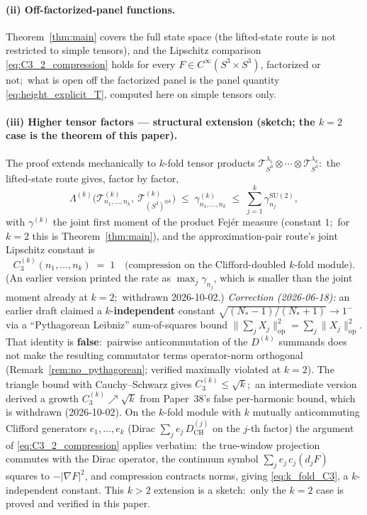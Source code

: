 \documentclass[11pt,a4paper]{article}
\theoremstyle{plain}
\theoremstyle{definition}
\newcommand{\sthree}{S^{3}}
\newcommand{\Tcal}{\mathcal{T}}
\newcommand{\opnorm}[1]{\lVert #1 \rVert_{\mathrm{op}}}
\newcommand{\SU}{\mathrm{SU}}
\newcommand{\DCH}{D_{\mathrm{CH}}}
\begin{document}
\paragraph{(ii) Off-factorized-panel functions.} Theorem~\ref{thm:main}
covers the full state space (the lifted-state route is not restricted to
simple tensors), and the Lipschitz comparison
\eqref{eq:C3_2_compression} holds for every
$F \in C^\infty(\sthree \times \sthree)$, factorized or not;\ what is open
off the factorized panel is the panel quantity \eqref{eq:height_explicit_T},
computed here on simple tensors only.

\paragraph{(iii) Higher tensor factors --- structural extension
(sketch; the $k=2$ case is the theorem of this paper).} The proof
extends mechanically to $k$-fold tensor products
$\Tcal_{\sthree}^{\lambda_1} \otimes \cdots \otimes
\Tcal_{\sthree}^{\lambda_k}$:\ the lifted-state route gives, factor by
factor,
\begin{equation}\label{eq:k_fold_main}
\Lambda^{(k)}\bigl(\Tcal^{(k)}_{n_{1}, \ldots, n_{k}},\
\Tcal^{(k)}_{(\sthree)^{\otimes k}}\bigr)
\;\le\; \gamma^{(k)}_{n_{1}, \ldots, n_{k}}
\;\le\; \sum_{j=1}^{k} \gamma^{\SU(2)}_{n_{j}},
\end{equation}
with $\gamma^{(k)}$ the joint first moment of the product Fej\'er measure
(constant $1$;\ for $k=2$ this is Theorem~\ref{thm:main}), and the
approximation-pair route's joint Lipschitz constant is
\begin{equation}\label{eq:k_fold_C3}
C_{3}^{(k)}(n_{1}, \ldots, n_{k}) \;=\; 1
\quad\text{(compression on the Clifford-doubled $k$-fold module)}.
\end{equation}
(An earlier version printed the rate as $\max_j \gamma_{n_j}$, which is
smaller than the joint moment already at $k = 2$;\ withdrawn
2026-10-02.) \emph{Correction (2026-06-18):} an earlier
draft claimed a $k$-\textbf{independent} constant
$\sqrt{(N_*-1)/(N_*+1)} \to 1^-$ via a ``Pythagorean Leibniz''
sum-of-squares bound $\opnorm{\sum_j X_j}^2 = \sum_j \opnorm{X_j}^2$.
That identity is \textbf{false}:\ pairwise anticommutation of the
$D^{(k)}$ summands does not make the resulting commutator terms
operator-norm orthogonal (Remark~\ref{rem:no_pythagorean}; verified
maximally violated at $k=2$). The triangle bound with
Cauchy--Schwarz gives $C_3^{(k)} \le \sqrt k$;\ an intermediate version
derived a growth $C_3^{(k)} \nearrow \sqrt k$ from Paper~38's false
per-harmonic bound, which is withdrawn (2026-10-02). On the $k$-fold
module with $k$ mutually anticommuting Clifford generators
$e_1, \ldots, e_k$ (Dirac $\sum_j e_j\,\DCH^{(j)}$ on the $j$-th factor) the
argument of \eqref{eq:C3_2_compression} applies verbatim:\ the true-window
projection commutes with the Dirac operator, the continuum symbol
$\sum_j e_j\,c_j(d_j F)$ squares to $-\lvert\nabla F\rvert^2$, and compression
contracts norms, giving \eqref{eq:k_fold_C3}, a $k$-independent constant.
This $k > 2$ extension is a sketch:\ only the $k = 2$ case is proved
and verified in this paper.
\end{document}
